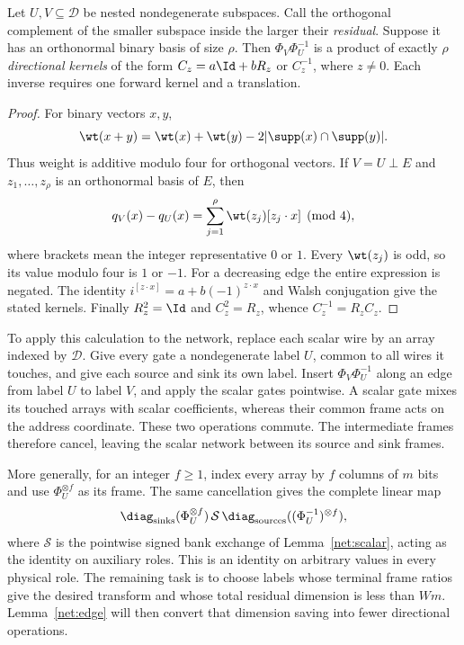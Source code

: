 \begin{lemma}\label{net:edge}
Let $U,V\subseteq\mathcal D$ be nested nondegenerate subspaces.
Call the orthogonal complement of the smaller subspace inside the
larger their \emph{residual}.  Suppose it has an orthonormal binary
basis of size $\rho$.
Then $\Phi_V\Phi_U^{-1}$ is a product of exactly $\rho$
\emph{directional kernels} of the form $C_z=a\Id+bR_z$ or $C_z^{-1}$,
where $z\ne0$.  Each inverse requires one forward kernel and a
translation.
\end{lemma}

\begin{proof}
For binary vectors $x,y$,
\[
 \wt(x+y)=\wt(x)+\wt(y)-2|\supp(x)\cap\supp(y)|.
\]
Thus weight is additive modulo four for orthogonal vectors.
If $V=U\mathbin\perp E$ and $z_1,\ldots,z_\rho$ is an
orthonormal basis of $E$, then
\[
 q_V(x)-q_U(x)
   =\sum_{j=1}^{\rho}\wt(z_j)[z_j\cdot x]\pmod4,
\]
where brackets mean the integer representative $0$ or $1$.
Every $\wt(z_j)$ is odd, so its value modulo four is $1$ or $-1$.
For a decreasing edge the entire expression is negated.
The identity
$i^{[z\cdot x]}=a+b(-1)^{z\cdot x}$ and Walsh conjugation
give the stated kernels.  Finally $R_z^2=\Id$ and
$C_z^2=R_z$, whence $C_z^{-1}=R_zC_z$.
\end{proof}

To apply this calculation to the network, replace each scalar wire by
an array indexed by $\mathcal D$.  Give every gate a nondegenerate label
$U$, common to all wires it touches, and give each source and sink its
own label.  Insert $\Phi_V\Phi_U^{-1}$ along an edge from label $U$ to
label $V$, and apply the scalar gates pointwise.  A scalar gate mixes
its touched arrays with scalar coefficients, whereas their common
frame acts on the address coordinate.  These two operations commute.
The intermediate frames therefore cancel, leaving the scalar network
between its source and sink frames.

More generally, for an integer $f\ge1$, index every array by $f$ columns
of $m$ bits and use $\Phi_U^{\otimes f}$ as its frame.  The same
cancellation gives the complete linear map
\begin{equation}\label{net:telescoping}
 \diag_{\mathrm{sinks}}(\Phi_U^{\otimes f})\,
 \mathcal S\,
 \diag_{\mathrm{sources}}((\Phi_U^{-1})^{\otimes f}),
\end{equation}
where $\mathcal S$ is the pointwise signed bank exchange of
Lemma~\ref{net:scalar}, acting as the identity on auxiliary roles.
This is an identity on arbitrary values in every physical role.
The remaining task is to choose labels whose terminal frame ratios
give the desired transform and whose total residual dimension is less
than $Wm$.  Lemma~\ref{net:edge} will then convert that dimension
saving into fewer directional operations.

